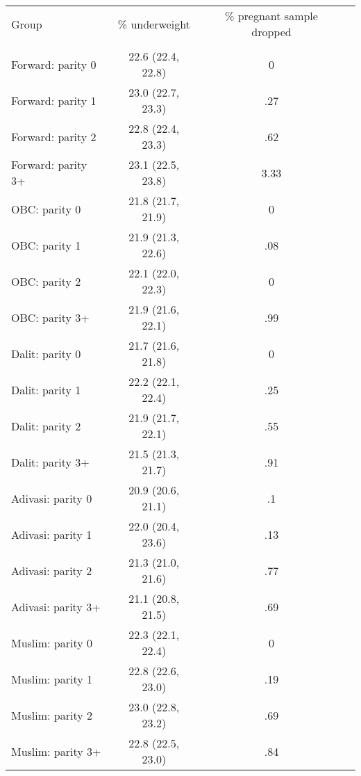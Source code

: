 \begin{tabular}{lccc}
\toprule
Group & \% underweight & \% pregnant sample dropped \\\\
\midrule
Forward: parity 0&22.6 (22.4, 22.8)&0\\
Forward: parity 1&23.0 (22.7, 23.3)&.27\\
Forward: parity 2&22.8 (22.4, 23.3)&.62\\
Forward: parity 3+&23.1 (22.5, 23.8)&3.33\\
OBC: parity 0&21.8 (21.7, 21.9)&0\\
OBC: parity 1&21.9 (21.3, 22.6)&.08\\
OBC: parity 2&22.1 (22.0, 22.3)&0\\
OBC: parity 3+&21.9 (21.6, 22.1)&.99\\
Dalit: parity 0&21.7 (21.6, 21.8)&0\\
Dalit: parity 1&22.2 (22.1, 22.4)&.25\\
Dalit: parity 2&21.9 (21.7, 22.1)&.55\\
Dalit: parity 3+&21.5 (21.3, 21.7)&.91\\
Adivasi: parity 0&20.9 (20.6, 21.1)&.1\\
Adivasi: parity 1&22.0 (20.4, 23.6)&.13\\
Adivasi: parity 2&21.3 (21.0, 21.6)&.77\\
Adivasi: parity 3+&21.1 (20.8, 21.5)&.69\\
Muslim: parity 0&22.3 (22.1, 22.4)&0\\
Muslim: parity 1&22.8 (22.6, 23.0)&.19\\
Muslim: parity 2&23.0 (22.8, 23.2)&.69\\
Muslim: parity 3+&22.8 (22.5, 23.0)&.84\\
\bottomrule
\end{tabular}
